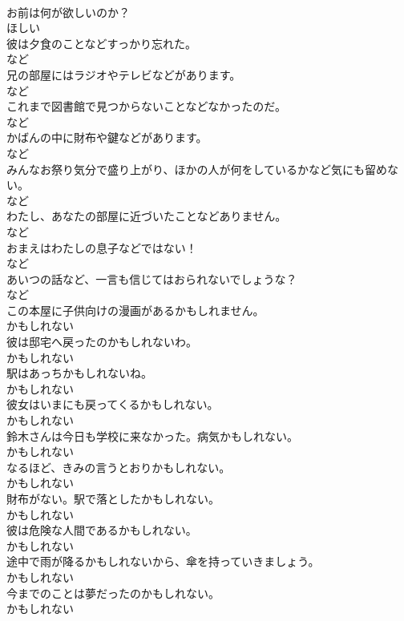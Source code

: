 \documentclass[8pt]{extreport}
\begin{document}
\begin{CJK}{UTF8}{min}
\\	お前は何が欲しいのか？	
\\	ほしい
\\	彼は夕食のことなどすっかり忘れた。	
\\	など
\\	兄の部屋にはラジオやテレビなどがあります。	
\\	など
\\	これまで図書館で見つからないことなどなかったのだ。	
\\	など
\\	かばんの中に財布や鍵などがあります。	
\\	など
\\	みんなお祭り気分で盛り上がり、ほかの人が何をしているかなど気にも留めない。	
\\	など
\\	わたし、あなたの部屋に近づいたことなどありません。	
\\	など
\\	おまえはわたしの息子などではない！	
\\	など
\\	あいつの話など、一言も信じてはおられないでしょうな？	
\\	など
\\	この本屋に子供向けの漫画があるかもしれません。	
\\	かもしれない
\\	彼は邸宅へ戻ったのかもしれないわ。	
\\	かもしれない
\\	駅はあっちかもしれないね。	
\\	かもしれない
\\	彼女はいまにも戻ってくるかもしれない。	
\\	かもしれない
\\	鈴木さんは今日も学校に来なかった。病気かもしれない。	
\\	かもしれない
\\	なるほど、きみの言うとおりかもしれない。	
\\	かもしれない
\\	財布がない。駅で落としたかもしれない。	
\\	かもしれない
\\	彼は危険な人間であるかもしれない。	
\\	かもしれない
\\	途中で雨が降るかもしれないから、傘を持っていきましょう。	
\\	かもしれない
\\	今までのことは夢だったのかもしれない。	
\\	かもしれない

\end{CJK}
\end{document}
